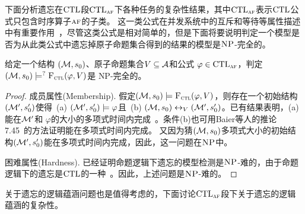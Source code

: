 下面分析遗忘在$\textrm{CTL}$段$\textrm{CTL}_{\textsc{a}\textsc{f}}$下各种任务的复杂性结果，其中$\textrm{CTL}_{\textsc{a}\textsc{f}}$表示$\textrm{CTL}$公式只包含时序算子$\textsc{a} \textsc{f}$的子类。
这一类公式在并发系统中的互斥和等待等属性描述中有重要作用~\cite{Baier:PMC:2008}，尽管这类公式是相对简单的，但是下面将要说明判定一个模型是否为从此类公式中遗忘掉原子命题集合得到的结果的模型是$\textsc{NP}$-完全的。
\begin{proposition}[模型检测]
	\label{modelChecking}
	给定一个结构 $({\cal M},s_0)$、原子命题集合$V\subseteq{\cal A}$和公式 $\varphi \in \textrm{CTL}_{\textsc{a}\textsc{f}}$，判定 $({\cal M},s_0) \models^? {\textsc{F}_{\textsc{ctl}}}(\varphi, V)$是 \textsc{NP}-完全的。
\end{proposition}
\begin{proof}
	成员属性(Membership). 假定$({\cal M},s_0) \models {\textsc{F}_{\textsc{ctl}}}(\varphi,V)$，则存在一个初始结构$({\cal M}', s_0')$使得\ (a) $({\cal M}',s_0') \models \varphi$且\ (b) $({\cal M},s_0) \leftrightarrow_V ({\cal M}',s_0')$。已有结果表明，(a)能在${\cal M}'$和 $\varphi$的大小的多项式时间内完成~\cite{DBLP:books/daglib/0007403}。条件(b)也可用Baier等人的推论 7.45~\cite{Baier:PMC:2008}的方法证明能在多项式时间内完成。
	又因为猜$({\cal M},s_0)$多项式大小的初始结构$({\cal M}',s_0')$能在多项式时间内完成，因此，这一问题在$\textsc{NP}$中。
	
	困难属性(Hardness). 已经证明命题逻辑下遗忘的模型检测是$\textsc{NP}$-难的，由于命题逻辑下的遗忘是$\textrm{CTL}$的一种~\cite{Zhang2008Properties}。因此，上述问题是$\textsc{NP}$-难的。
\end{proof}

关于遗忘的逻辑蕴涵问题也是值得考虑的，下面讨论$\textrm{CTL}_{\textsc{a}\textsc{f}}$段下关于遗忘的逻辑蕴涵的复杂性。

